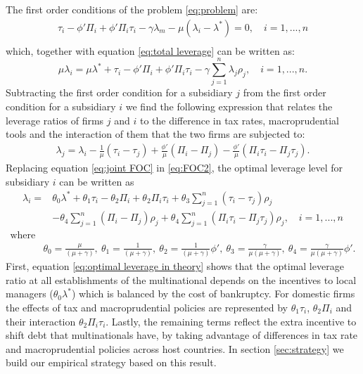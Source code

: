 \documentclass[12pt]{article}
\begin{document}
	The first order conditions of the problem \ref{eq:problem} are:
	\begin{equation}
	\begin{aligned}
	\tau_i-\phi'\Pi_i+\phi'\Pi_i\tau_{i}-\gamma\lambda_m-\mu(\lambda_i-\lambda^*)=0, \quad i=1,...,n\\
	\end{aligned}
	\label{eq:FOC}
	\end{equation}
	which, together with equation \ref{eq:total leverage} can be written as:  
	\begin{equation}
	\mu\lambda_i=\mu\lambda^*+\tau_{i}-\phi'\Pi_i+\phi'\Pi_i\tau_{i}-\gamma \sum_{j=1}^{n}\lambda_j\rho_j, \quad i=1,...,n.
	\label{eq:FOC2}
	\end{equation}
	Subtracting the first order condition for a subsidiary $j$ from the first order condition for a subsidiary $i$ we find the following expression that relates the leverage ratios of firms $j$ and $i$ to the difference in tax rates, macroprudential tools and the interaction of them that the two firms are subjected to:
	\begin{equation}
	\begin{aligned}
	\lambda_j=\lambda_i-\frac{1}{\mu}(\tau_i-\tau_j)+\frac{\phi'}{\mu}(\Pi_i-\Pi_j)-\frac{\phi'}{\mu}(\Pi_i\tau_i-\Pi_j\tau_j).
	\end{aligned}
	\label{eq:joint FOC}
	\end{equation}
	Replacing equation \ref{eq:joint FOC} in \ref{eq:FOC2}, the optimal leverage level for subsidiary $i$ can be written as  
	\begin{equation}
	\begin{aligned}
	\lambda_i=&\theta_0\lambda^*+\theta_1\tau_i-\theta_2\Pi_i+\theta_2\Pi_i\tau_{i}+\theta_3\sum_{j=1}^{n}(\tau_i-\tau_j)\rho_j\\
	&-\theta_4\sum_{j=1}^{n}(\Pi_i-\Pi_j)\rho_j+\theta_4\sum_{j=1}^{n}(\Pi_i\tau_i-\Pi_j\tau_j)\rho_j, \quad i=1,...,n
	\end{aligned}
	\label{eq:optimal leverage in theory}
	\end{equation}
	\begin{equation*}
	\begin{aligned}
	\text{where} &\\ &\theta_0=\frac{\mu}{(\mu+\gamma)}, \ \theta_1=\frac{1}{(\mu+\gamma)}, \
	\theta_2=\frac{1}{(\mu+\gamma)}\phi', \
	\theta_3=\frac{\gamma}{\mu(\mu+\gamma)}, \
	\theta_4=\frac{\gamma}{\mu(\mu+\gamma)}\phi'.
	\end{aligned}
	\end{equation*}
    First, equation \ref{eq:optimal leverage in theory} shows that the optimal leverage ratio at all establishments of the multinational depends on the incentives to local managers ($\theta_0\lambda^*$) which is balanced by the cost of bankruptcy. For domestic firms the effects of tax and macroprudential policies are represented by $\theta_1\tau_i$, $\theta_2\Pi_i$ and their interaction $\theta_2\Pi_i\tau_i$. Lastly, the remaining terms reflect the extra incentive to shift debt that multinationals have, by taking advantage of differences in tax rate and macroprudential policies across host countries. In section \ref{sec:strategy} we build our empirical strategy based on this result.
\end{document}
